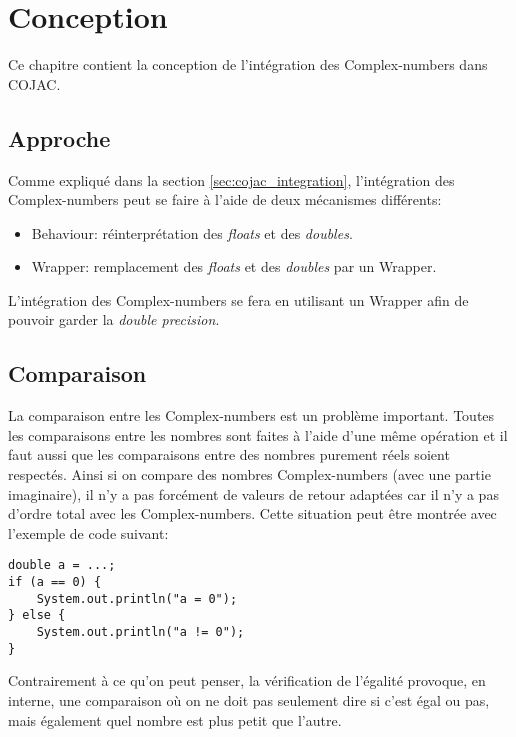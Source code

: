 \section{Conception}

Ce chapitre contient la conception de l'intégration des \glspl{Complex-number} dans \gls{COJAC}.

\subsection{Approche}
\label{sec:complex_approach}

Comme expliqué dans la section \ref{sec:cojac_integration}, l'intégration des \glspl{Complex-number} peut se faire à l'aide de deux mécanismes différents:

\begin{itemize}
    \item \Gls{Behaviour}: réinterprétation des \textit{floats} et des \textit{doubles}.
    \item \Gls{Wrapper}: remplacement des \textit{floats} et des \textit{doubles} par un \gls{Wrapper}.
\end{itemize}

L'intégration des \glspl{Complex-number} se fera en utilisant un \gls{Wrapper} afin de pouvoir garder la \textit{double precision}.

\subsection{Comparaison}
\label{sec:complex_design_comparison}

La comparaison entre les \glspl{Complex-number} est un problème important. Toutes les comparaisons entre les nombres sont faites à l'aide d'une même opération et il faut aussi que les comparaisons entre des nombres purement réels soient respectés. Ainsi si on compare des nombres \glspl{Complex-number} (avec une partie imaginaire), il n'y a pas forcément de valeurs de retour adaptées car il n'y a pas d'ordre total avec les \glspl{Complex-number}. Cette situation peut être montrée avec l'exemple de code suivant:

\begin{verbatim}
double a = ...;
if (a == 0) {
    System.out.println("a = 0");
} else {
    System.out.println("a != 0");
}
\end{verbatim}

Contrairement à ce qu'on peut penser, la vérification de l'égalité provoque, en interne, une comparaison où on ne doit pas seulement dire si c'est égal ou pas, mais également quel nombre est plus petit que l'autre.

